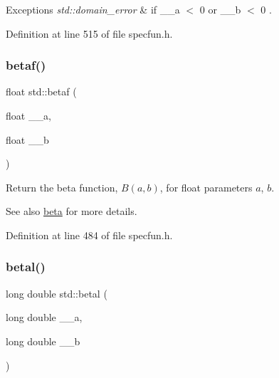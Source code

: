 \begin{DoxyExceptions}{Exceptions}
{\em std\+::domain\+\_\+error} & if {\ttfamily  \+\_\+\+\_\+a $<$ 0 } or {\ttfamily  \+\_\+\+\_\+b $<$ 0 }. \\
\hline
\end{DoxyExceptions}


Definition at line 515 of file specfun.\+h.

\mbox{\label{group__tr29124__math__spec__func_ga12dc61ee4c09172151cf092ed387e203}} 
\subsubsection{\texorpdfstring{betaf()}{betaf()}}
{\footnotesize\ttfamily float std\+::betaf (\begin{DoxyParamCaption}\item[{float}]{\+\_\+\+\_\+a,  }\item[{float}]{\+\_\+\+\_\+b }\end{DoxyParamCaption})\hspace{0.3cm}{\ttfamily [inline]}}

Return the beta function, $ B(a,b) $, for {\ttfamily float} parameters $ a $, $ b $.

\begin{DoxySeeAlso}{See also}
\hyperlink{group__tr29124__math__spec__func_gacd36403ae64b89840b1504f97024dcee}{beta} for more details. 
\end{DoxySeeAlso}


Definition at line 484 of file specfun.\+h.

\mbox{\label{group__tr29124__math__spec__func_ga8caca1cef099f41a88111209c36ce06c}} 
\subsubsection{\texorpdfstring{betal()}{betal()}}
{\footnotesize\ttfamily long double std\+::betal (\begin{DoxyParamCaption}\item[{long double}]{\+\_\+\+\_\+a,  }\item[{long double}]{\+\_\+\+\_\+b }\end{DoxyParamCaption})\hspace{0.3cm}{\ttfamily [inline]}}

